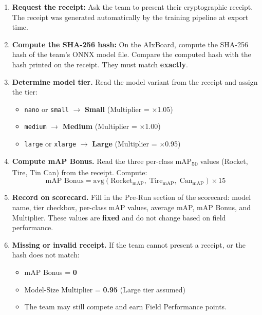 \documentclass[a4]{article}
\begin{document}
\begin{enumerate}
    \item \textbf{Request the receipt:} Ask the team to present their cryptographic receipt. The receipt was generated automatically by the training pipeline at export time.

    \item \textbf{Compute the SHA-256 hash:} On the AIxBoard, compute the SHA-256 hash of the team's ONNX model file. Compare the computed hash with the hash printed on the receipt. They must match \textbf{exactly}.

    \item \textbf{Determine model tier.} Read the model variant from the receipt and assign the tier:
    \begin{itemize}
        \item \texttt{nano} or \texttt{small} $\rightarrow$ \textbf{Small} (Multiplier = $\times$1.05)
        \item \texttt{medium} $\rightarrow$ \textbf{Medium} (Multiplier = $\times$1.00)
        \item \texttt{large} or \texttt{xlarge} $\rightarrow$ \textbf{Large} (Multiplier = $\times$0.95)
    \end{itemize}

    \item \textbf{Compute mAP Bonus.} Read the three per-class mAP\textsubscript{50} values (Rocket, Tire, Tin Can) from the receipt. Compute:
    \begin{equation*}
    \text{mAP Bonus} = \text{avg}(\text{Rocket}_{\text{mAP}},\;\text{Tire}_{\text{mAP}},\;\text{Can}_{\text{mAP}}) \times 15
    \end{equation*}

    \item \textbf{Record on scorecard.} Fill in the Pre-Run section of the scorecard: model name, tier checkbox, per-class mAP values, average mAP, mAP Bonus, and Multiplier. These values are \textbf{fixed} and do not change based on field performance.

    \item \textbf{Missing or invalid receipt.} If the team cannot present a receipt, or the hash does not match:
    \begin{itemize}
        \item mAP Bonus = \textbf{0}
        \item Model-Size Multiplier = \textbf{0.95} (Large tier assumed)
        \item The team may still compete and earn Field Performance points.
    \end{itemize}
\end{enumerate}
\end{document}
